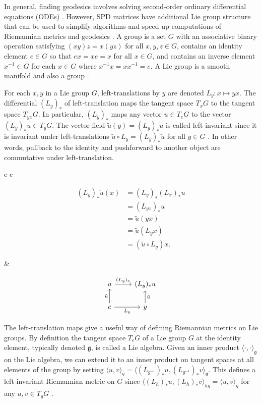 \documentclass[../../../main.tex]{subfiles}
\begin{document}
In general, finding geodesics involves solving second-order ordinary differential equations (ODEs) \autocite{Sommer2020}. However, SPD matrices have additional Lie group structure that can be used to simplify algorithms and speed up computations of Riemannian metrics and geodesics \autocite{Pennec2020}. A group is a set $G$ with an associative binary operation satisfying $(xy)z=x(yz)$ for all $x,y,z \in G$, contains an identity element $e \in G$ so that $ex=xe=x$ for all $x \in G$, and contains an inverse element $x^{-1} \in G$ for each $x \in G$ where $x^{-1}x=xx^{-1}=e$. A Lie group is a smooth manifold and also a group \autocite{Sommer2020}.

For each $x,y$ in a Lie group $G$, left-translations by $y$ are denoted $L_y\colon x \mapsto yx$. The differential $(L_y)_\ast$ of left-translation maps the tangent space $T_xG$ to the tangent space $T_{yx}G$. In particular, $(L_y)_\ast$ maps any vector $u \in T_eG$ to the vector $(L_y)_\ast u \in T_yG$. The vector field $\tilde{u}(y) = (L_y)_\ast u$ is called left-invariant since it is invariant under left-translations $\tilde{u} \circ L_y = (L_y)_\ast \tilde{u}$ for all $y \in G$ \autocite{Sommer2020}. In other words, pullback to the identity and pushforward to another object are commutative under left-translation.

\begin{tabular}{c c}
\begin{minipage}{0.5\textwidth}
\[
\begin{aligned}
(L_y)_\ast\tilde{u}(x) &= (L_y)_\ast(L_x)_\ast u \\
&= (L_{yx})_\ast u \\
&= \tilde{u}(yx) \\
& = \tilde{u}(L_yx) \\
&= (\tilde{u} \circ L_y)x.
\end{aligned}
\]
\end{minipage} &
\begin{minipage}{0.4\textwidth}
\[
\begin{tikzcd}
u \arrow[r, "(L_y)_\ast"] & (L_y)_\ast u \\
e \arrow[u, "\tilde{u}"] \arrow[r, "L_y"'] & y \arrow[u, "\tilde{u}"']
\end{tikzcd}
\]
\end{minipage}
\end{tabular}

The left-translation maps give a useful way of defining Riemannian metrics on Lie groups. By definition the tangent space $T_eG$ of a Lie group $G$ at the identity element, typically denoted $\mathfrak{g}$, is called a Lie algebra. Given an inner product $\langle \cdot,\cdot \rangle_\mathfrak{g}$ on the Lie algebra, we can extend it to an inner product on tangent spaces at all elements of the group by setting $\langle u,v \rangle_g = \langle (L_{g^{-1}})_\ast u, (L_{g^{-1}})_\ast v \rangle_\mathfrak{g}$. This defines a left-invariant Riemannian metric on $G$ since $\langle (L_h)_\ast u, (L_h)_\ast v \rangle_{hg} = \langle u,v \rangle_g$ for any $u,v\in T_gG$ \autocite{Sommer2020}.
\end{document}
